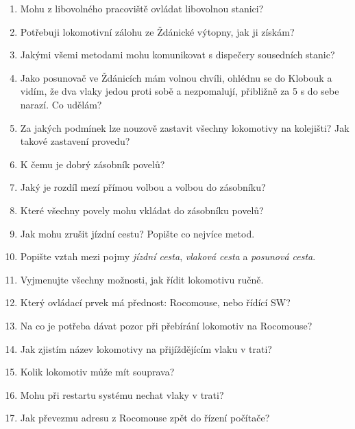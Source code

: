 \documentclass[12pt,a4paper]{article}
\begin{document}
\begin{enumerate}
	\item Mohu z libovolného pracoviště ovládat libovolnou stanici?
	
	\item Potřebuji lokomotivní zálohu ze Ždánické výtopny, jak ji získám?
	
	\item Jakými všemi metodami mohu komunikovat s dispečery sousedních stanic?
	
	\item Jako posunovač ve Ždánicích mám volnou chvíli, ohlédnu se do Klobouk a vidím, že dva vlaky jedou proti sobě a nezpomalují, přibližně za 5 s do sebe narazí. Co udělám?
	
	\item Za jakých podmínek lze nouzově zastavit všechny lokomotivy na kolejišti? Jak takové zastavení provedu?
	
	\item K čemu je dobrý zásobník povelů?
	
	\item Jaký je rozdíl mezí přímou volbou a volbou do zásobníku?
	
	\item Které všechny povely mohu vkládat do zásobníku povelů?
	
	\item Jak mohu zrušit jízdní cestu? Popište co nejvíce metod.
	
	\item Popište vztah mezi pojmy \textit{jízdní cesta}, \textit{vlaková cesta} a \textit{posunová cesta}.
	
	\item Vyjmenujte všechny možnosti, jak řídit lokomotivu ručně.
	
	\item Který ovládací prvek má přednost: Rocomouse, nebo řídící SW?
	
	\item Na co je potřeba dávat pozor při přebírání lokomotiv na Rocomouse?
	
	\item Jak zjistím název lokomotivy na přijíždějícím vlaku v trati?
	
	\item Kolik lokomotiv může mít souprava?
	
	\item Mohu při restartu systému nechat vlaky v trati?
	
	\item Jak převezmu adresu z Rocomouse zpět do řízení počítače?
	

\end{enumerate}
\end{document}
